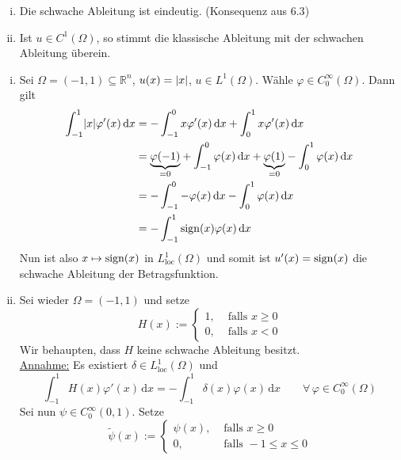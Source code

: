 \begin{bemerkung}
	\begin{enumerate}[(i)]
		\item Die schwache Ableitung ist eindeutig. (Konsequenz aus $6.3$)
		\item Ist $u \in C^1(\Omega)$, so stimmt die klassische Ableitung mit der schwachen Ableitung überein.
	\end{enumerate}
\end{bemerkung}
\begin{beispiel}
	\begin{enumerate}[(i)]
		\item Sei $\Omega = (-1,1) \subseteq \mathbb{R}^n$, $u(x) = \lvert x\rvert$, $u \in L^1(\Omega)$. Wähle $\varphi \in C^{\infty}_0(\Omega)$. Dann gilt
		\begin{align*}
			\int_{-1}^{1} \lvert x\rvert \varphi'(x) \,\mathrm{d}x &= - \int_{-1}^{0} x \varphi'(x) \,\mathrm{d}x + \int_{0}^{1} x \varphi'(x) \,\mathrm{d}x \\
			&= \underset{=0}{\underbrace{\varphi(-1)}} + \int_{-1}^{0} \varphi(x) \,\mathrm{d}x + \underset{=0}{\underbrace{\varphi(1)}} - \int_{0}^{1} \varphi(x) \,\mathrm{d}x \\
			&= - \int_{-1}^{0} - \varphi(x) \,\mathrm{d}x - \int_{0}^{1} \varphi(x) \,\mathrm{d}x \\
			&= - \int_{-1}^{1} \operatorname{sign}(x) \varphi(x) \,\mathrm{d}x
		\end{align*}
		Nun ist also $x \mapsto \operatorname{sign}(x)$ in $L^1_{\text{loc}}(\Omega)$ und somit ist $u'(x) = \operatorname{sign}(x)$ die schwache Ableitung der Betragsfunktion.
		\item Sei wieder $\Omega = (-1,1)$ und setze
		\[
			H(x) := \begin{cases}
				1, &\text{ falls }x \geq 0\\
				0, &\text{ falls }x < 0
			\end{cases}
		\]
		Wir behaupten, dass $H$ keine schwache Ableitung besitzt. \\
		\underline{Annahme:} Es existiert $\delta \in L^1_{\text{loc}}(\Omega)$ und 
		\[
			\int_{-1}^{1} H(x)\varphi'(x) \,\mathrm{d}x = - \int_{-1}^{1} \delta (x) \varphi(x) \,\mathrm{d}x \qquad \forall\, \varphi \in C^{\infty}_0(\Omega)
		\]
		Sei nun $\psi \in C^{\infty}_0(0,1)$. Setze 
		\[
			\tilde \psi(x) := \begin{cases}
				\psi(x), &\text{ falls }x \geq 0\\
				0, &\text{ falls } -1 \leq x \leq 0
			\end{cases}
		\]

\end{enumerate}
\end{beispiel}
